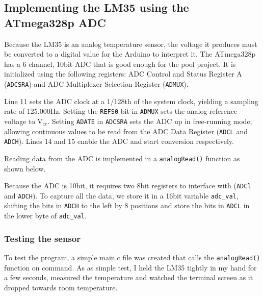 \documentclass[11pt,a4paper,titlepage]{article}
\begin{document}
	
	\subsection{Implementing the LM35 using the ATmega328p ADC}
	
	Because the LM35 is an analog temperature sensor, the voltage it produces must be converted to a digital value for the Arduino to interpret it.
	The ATmega328p has a 6 channel, 10bit ADC that is good enough for the pool project. It is initialized using the following registers: ADC Control and Status Register A (\verb|ADCSRA|) and ADC Multiplexer Selection Register (\verb|ADMUX|).
	
	
	
	\noindent Line 11 sets the ADC clock at a 1/128th of the system clock, yielding a sampling rate of 125.000Hz. Setting the \verb|REFS0| bit in \verb|ADMUX| sets the analog reference voltage to $\text{V}_{\text{cc}}$. Setting \verb|ADATE| in \verb|ADCSRA| sets the ADC up in free-running mode, allowing continuous values to be read from the ADC Data Register (\verb|ADCL| and \verb|ADCH|). Lines 14 and 15 enable the ADC and start conversion respectively.
	
	Reading data from the ADC is implemented in a \verb|analogRead()| function as shown below.
	
	
	\noindent Because the ADC is 10bit, it requires two 8bit registers to interface with (\verb|ADCl| and \verb|ADCH|). To capture all the data, we store it in a 16bit variable \verb|adc_val|, shifting the bits in \verb|ADCH| to the left by 8 positions and store the bits in \verb|ADCL| in the lower byte of \verb|adc_val|.
	
	\subsubsection{Testing the sensor}
	
	To test the program, a simple main.c file was created that calls the \verb|analogRead()| function on command. As as simple test, I held the LM35 tightly in my hand for a few seconds, measured the temperature and watched the terminal screen as it dropped towards room temperature.
	
	
	
\end{document}
